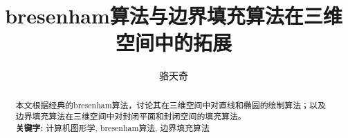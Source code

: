 \documentclass{article}
\title{bresenham算法与边界填充算法在三维空间中的拓展}
\author{骆天奇}
\date{}
\begin{document}
	\maketitle
	\begin{abstract}
		本文根据经典的bresenham算法，讨论其在三维空间中对直线和椭圆的绘制算法；以及边界填充算法在三维空间中对封闭平面和封闭空间的填充算法。\\
		\textbf{关键字:} 计算机图形学, bresenham算法, 边界填充算法
	\end{abstract}
	
	
	
\end{document}
